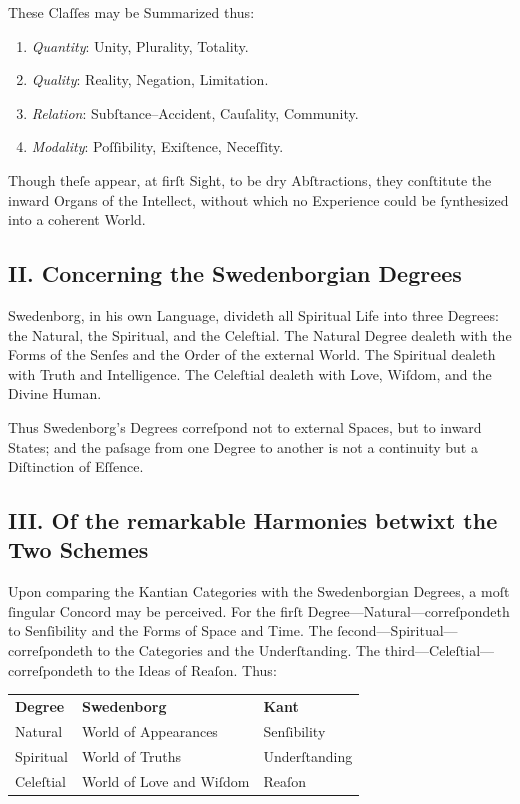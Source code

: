 \documentclass[12pt]{article}
\begin{document}
These Claſſes may be Summarized thus:

\begin{enumerate}
\item \textit{Quantity}: Unity, Plurality, Totality.
\item \textit{Quality}: Reality, Negation, Limitation.
\item \textit{Relation}: Subſtance–Accident, Cauſality, Community.
\item \textit{Modality}: Poſſibility, Exiſtence, Neceſſity.
\end{enumerate}

Though theſe appear, at firſt Sight, to be dry Abſtractions, they conſtitute 
the inward Organs of the Intellect, without which no Experience could be 
ſynthesized into a coherent World.

\subsection*{II. Concerning the Swedenborgian Degrees}
Swedenborg, in his own Language, divideth all Spiritual Life into three 
Degrees: the Natural, the Spiritual, and the Celeſtial. The Natural Degree 
dealeth with the Forms of the Senſes and the Order of the external World. The 
Spiritual dealeth with Truth and Intelligence. The Celeſtial dealeth with 
Love, Wiſdom, and the Divine Human.

Thus Swedenborg’s Degrees correſpond not to external Spaces, but to inward 
States; and the paſsage from one Degree to another is not a continuity but a 
Diſtinction of Eſſence.

\subsection*{III. Of the remarkable Harmonies betwixt the Two Schemes}
Upon comparing the Kantian Categories with the Swedenborgian Degrees, a moſt 
ſingular Concord may be perceived. For the firſt Degree—Natural—correſpondeth 
to Senſibility and the Forms of Space and Time. The ſecond—Spiritual— 
correſpondeth to the Categories and the Underſtanding. The third—Celeſtial— 
correſpondeth to the Ideas of Reaſon. Thus:

\begin{center}
\begin{tabular}{lll}
\textbf{Degree} & \textbf{Swedenborg} & \textbf{Kant} \\
Natural & World of Appearances & Senſibility \\
Spiritual & World of Truths & Underſtanding \\
Celeſtial & World of Love and Wiſdom & Reaſon \\
\end{tabular}
\end{center}
\end{document}

